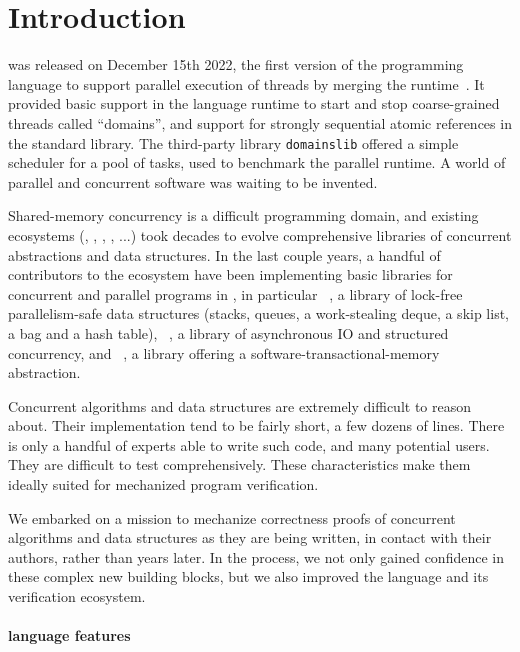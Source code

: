 \section{Introduction}
\label{sec:introduction}

 was released on December 15th 2022, the first version of the \OCaml programming language to support parallel execution of \OCaml threads by merging the \MulticoreOCaml runtime~\citep{DBLP:journals/pacmpl/Sivaramakrishnan20}.
It provided basic support in the language runtime to start and stop coarse-grained threads called ``domains'', and support for strongly sequential atomic references in the standard library.
The third-party library \texttt{domainslib} offered a simple scheduler for a pool of tasks, used to benchmark the parallel runtime.
A world of parallel and concurrent software was waiting to be invented.

Shared-memory concurrency is a difficult programming domain, and existing ecosystems (\Cpp, \Java, \Haskell, \Rust, \Go...) took decades to evolve comprehensive libraries of concurrent abstractions and data structures.
In the last couple years, a handful of contributors to the \OCaml ecosystem have been implementing basic libraries for concurrent and parallel programs in \OCaml, in particular \Saturn~\citep{saturn}, a library of lock-free parallelism-safe data structures (stacks, queues, a work-stealing deque, a skip list, a bag and a hash table), \Eio~\citep{eio}, a library of asynchronous IO and structured concurrency, and \Kcas~\citep{kcas}, a library offering a software-transactional-memory abstraction.

Concurrent algorithms and data structures are extremely difficult to reason about.
Their implementation tend to be fairly short, a few dozens of lines.
There is only a handful of experts able to write such code, and many potential users.
They are difficult to test comprehensively.
These characteristics make them ideally suited for mechanized program verification.

We embarked on a mission to mechanize correctness proofs of \OCaml concurrent algorithms and data structures as they are being written, in contact with their authors, rather than years later.
In the process, we not only gained confidence in these complex new building blocks, but we also improved the \OCaml language and its verification ecosystem.

\paragraph{\OCaml language features}

